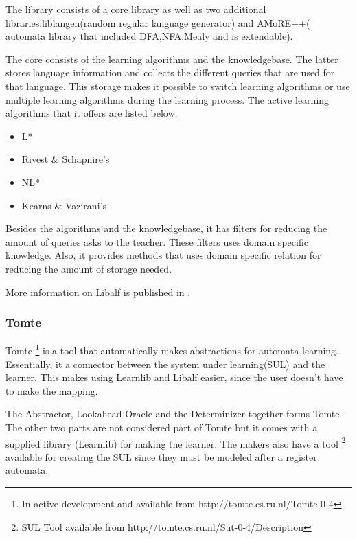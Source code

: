 \documentclass[multi,crop=false,class=article]{standalone}
\begin{document}
The library consists of a core library as well as two additional libraries:liblangen(random regular language generator) and AMoRE++(
automata library that included DFA,NFA,Mealy and is extendable).

The core consists of the learning algorithms and the knowledgebase. The latter 
stores language information and collects the different queries that are used 
for that language. This storage makes it possible to switch learning algorithms 
or use multiple learning algorithms during the learning process. The active 
learning algorithms that it offers are listed below.

\begin{itemize}
	\item L*
	\item Rivest \& Schapnire's
	\item NL*
	\item Kearns \& Vazirani's
\end{itemize}

Besides the algorithms and the knowledgebase, it has filters for reducing the 
amount of queries asks to the teacher. These filters uses domain specific 
knowledge. %
Also, it provides methods that uses domain specific relation for reducing the 
amount of storage needed. 

More information on Libalf is published in \cite{Bollig2010}.

\subsubsection{Tomte}
\label{sssec:tomte}
Tomte \footnote{In active development and available from 
http://tomte.cs.ru.nl/Tomte-0-4} is a tool that automatically makes 
abstractions for automata learning. Essentially, it a connector between the 
system under learning(SUL) and the learner. This makes using Learnlib and 
Libalf easier, since the user doesn't have to make the mapping.


The Abstractor, Lookahead Oracle and the Determinizer together forms Tomte. The 
other two parts are not considered part
of Tomte but it comes with a supplied library (Learnlib) for making the learner.
The makers also have a tool \footnote{SUL Tool available from 
http://tomte.cs.ru.nl/Sut-0-4/Description} available for creating the SUL since 
they must be modeled after a register automata.
 
\end{document}
